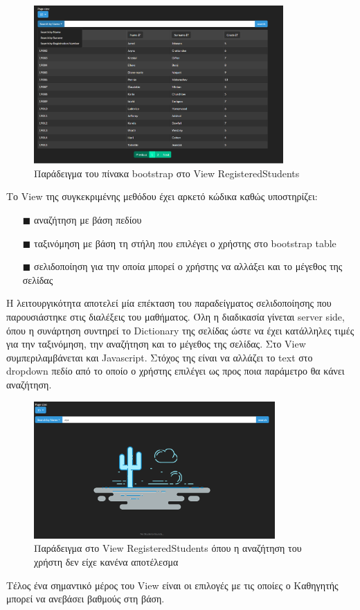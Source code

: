 \documentclass[12pt]{article}
\begin{document}
\begin{itemize}
	 \begin{figure}[H]
		\centering
		\includegraphics[width=0.85\textwidth]{pages1.png}
		\caption{Παράδειγμα του πίνακα bootstrap στο View RegisteredStudents}
	\end{figure}
	
	Το View της συγκεκριμένης μεθόδου έχει αρκετό κώδικα καθώς υποστηρίζει:
	\begin{itemize}
		\item[$\blacksquare$] αναζήτηση με βάση πεδίου
		\item[$\blacksquare$] ταξινόμηση με βάση τη στήλη που επιλέγει ο χρήστης στο bootstrap table
		\item[$\blacksquare$] σελιδοποίηση για την οποία μπορεί ο χρήστης να αλλάξει και το μέγεθος της σελίδας
	\end{itemize}
	
	Η λειτουργικότητα αποτελεί μία επέκταση του παραδείγματος σελιδοποίησης που παρουσιάστηκε στις διαλέξεις του μαθήματος. Όλη η διαδικασία γίνεται server side, όπου η συνάρτηση συντηρεί το Dictionary της σελίδας ώστε να έχει κατάλληλες τιμές για την ταξινόμηση, την αναζήτηση και το μέγεθος της σελίδας. Στο View συμπεριλαμβάνεται και Javascript. Στόχος της είναι να αλλάζει το text στο dropdown πεδίο από το οποίο ο χρήστης επιλέγει ως προς ποια παράμετρο θα κάνει αναζήτηση. 
	
	 \begin{figure}[H]
		\centering
		\includegraphics[width=0.82\textwidth]{empty2view.png}
		\caption{Παράδειγμα στο View RegisteredStudents όπου η αναζήτηση του χρήστη δεν είχε κανένα αποτέλεσμα}
	\end{figure}
	Τέλος ένα σημαντικό μέρος του View είναι οι επιλογές με τις οποίες ο Καθηγητής μπορεί να ανεβάσει βαθμούς στη βάση.
	

\end{itemize}
\end{document}
